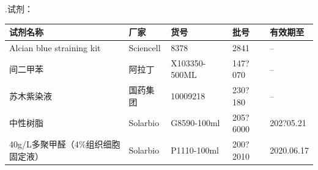 \documentclass[UTF8,10pt,a4paper,fontset=fandol]{ctexart}
\newcommand{\fieldvalue}[1]{#1}
\newcommand{\handwritten}[1]{#1}
\begin{document}
\medskip
{}.\quad 试剂：

\begin{center}
\small
\begin{tabular}{|p{3.7cm}|p{1.8cm}|p{2.5cm}|p{2.0cm}|p{1.6cm}|}
\hline
试剂名称 & 厂家 & 货号 & 批号 & 有效期至 \\ \hline
Alcian blue straining kit &
\fieldvalue{Sciencell} &
\fieldvalue{8378} &
\fieldvalue{\handwritten{2841}} &
\fieldvalue{--}
\\ \hline
间二甲苯 &
\fieldvalue{阿拉丁} &
\fieldvalue{X103350-500ML} &
\fieldvalue{\handwritten{147?070}} &
\fieldvalue{--}
\\ \hline
苏木紫染液 &
\fieldvalue{国药集团} &
\fieldvalue{10009218} &
\fieldvalue{\handwritten{230?180}} &
\fieldvalue{--}
\\ \hline
中性树脂 &
\fieldvalue{Solarbio} &
\fieldvalue{G8590-100ml} &
\fieldvalue{\handwritten{205?6000}} &
\fieldvalue{\handwritten{202?05.21}}
\\ \hline
40g/L多聚甲醛（4\%组织细胞固定液） &
\fieldvalue{Solarbio} &
\fieldvalue{P1110-100ml} &
\fieldvalue{\handwritten{200?2010}} &
\fieldvalue{\handwritten{2020.06.17}}
\\ \hline
\end{tabular}
\end{center}
\end{document}
